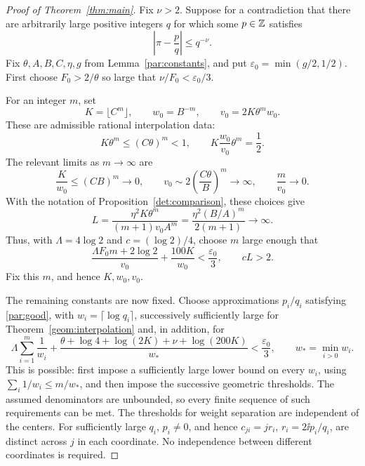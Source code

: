\begin{proof}[Proof of Theorem~\ref{thm:main}]
Fix \(\nu>2\). Suppose for a contradiction that there are arbitrarily
large positive integers \(q\) for which some \(p\in\mathbb Z\) satisfies
\begin{equation}\label{par:good}
\left|\pi-\frac pq\right|\le q^{-\nu}.
\end{equation}
Fix \(\theta,A,B,C,\eta,g\) from Lemma~\ref{par:constants}, and put
\(\varepsilon_0=\min(g/2,1/2)\).
First choose \(F_0>2/\theta\) so large that
\(\nu/F_0<\varepsilon_0/3\).

For an integer \(m\), set
\begin{equation}\label{par:dimension}
K=\lfloor C^m\rfloor,\qquad
w_0=B^{-m},\qquad
v_0=2K\theta^m w_0.
\end{equation}
These are admissible rational interpolation data:
\begin{equation}\label{par:volume}
K\theta^m\le(C\theta)^m<1,\qquad
K\frac{w_0}{v_0}\theta^m=\frac12.
\end{equation}
The relevant limits as \(m\to\infty\) are
\begin{equation}\label{par:limits}
\frac{K}{w_0}\le(CB)^m\longrightarrow0,\qquad
v_0\sim2\left(\frac{C\theta}{B}\right)^m\longrightarrow\infty,
\qquad
\frac{m}{v_0}\longrightarrow0.
\end{equation}
With the notation of Proposition~\ref{det:comparison}, these choices give
\begin{equation}\label{par:collision-growth}
L=\frac{\eta^2K\theta^m}{(m+1)v_0A^m}
 =\frac{\eta^2(B/A)^m}{2(m+1)}\longrightarrow\infty.
\end{equation}
Thus, with \(\Lambda=4\log2\) and \(c=(\log2)/4\), choose \(m\) large
enough that
\begin{equation}\label{par:dimension-margin}
\frac{\Lambda F_0m+2\log2}{v_0}+\frac{100K}{w_0}
 <\frac{\varepsilon_0}{3},
\qquad cL>2.
\end{equation}
Fix this \(m\), and hence \(K,w_0,v_0\).

The remaining constants are now fixed. Choose approximations
\(p_i/q_i\) satisfying \eqref{par:good}, with
\(w_i=\lceil\log q_i\rceil\), successively sufficiently large for
Theorem~\ref{geom:interpolation} and, in addition, for
\begin{equation}\label{par:weight-margin}
\Lambda\sum_{i=1}^m\frac1{w_i}
+\frac{\theta+\log4+\log(2K)+\nu+\log(200K)}{w_*}
 <\frac{\varepsilon_0}{3},
\qquad w_*=\min_{i>0}w_i.
\end{equation}
This is possible: first impose a sufficiently large lower bound on
every \(w_i\), using \(\sum_i1/w_i\le m/w_*\), and then impose the
successive geometric thresholds. The assumed denominators are
unbounded, so every finite sequence of such requirements can be met.
The thresholds for weight separation are independent of the centers.
For sufficiently large \(q_i\), \(p_i\ne0\), and hence
\(c_{ji}=jr_i\), \(r_i=2\ii p_i/q_i\), are distinct across \(j\) in
each coordinate. No independence between different coordinates is
required.


\end{proof}
